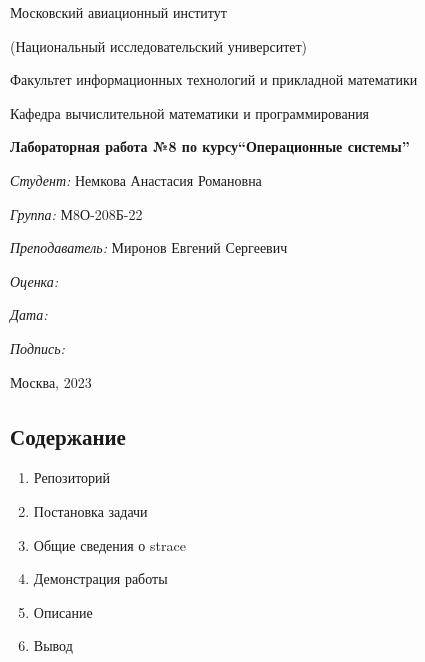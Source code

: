 \documentclass[a4paper, 14pt]{article}
\begin{document}
\thispagestyle{empty}	
\begin{center}
	Московский авиационный институт
	
	(Национальный исследовательский университет)
	
	Факультет информационных технологий и прикладной математики
	
	Кафедра вычислительной математики и программирования
	
\end{center}
\vspace{40ex}
\begin{center}
	\textbf{\large{Лабораторная работа №8 по курсу\linebreak \textquotedblleft Операционные системы\textquotedblright}}
\end{center}
\vspace{35ex}
\begin{flushright}
	\textit{Студент: } Немкова Анастасия Романовна
	
	\vspace{2ex}
	\textit{Группа: } М8О-208Б-22
	
	\vspace{2ex}
	\textit{Преподаватель: } Миронов Евгений Сергеевич
	
	\vspace{2ex}
	\textit{Оценка: } \underline{\quad\quad\quad\quad\quad\quad}
	
	 \vspace{2ex}
	\textit{Дата: } \underline{\quad\quad\quad\quad\quad\quad}
	
	\vspace{2ex}
	\textit{Подпись: } \underline{\quad\quad\quad\quad\quad\quad}
	
\end{flushright}

\vspace{5ex}

\begin{vfill}
	\begin{center}
		Москва, 2023
	\end{center}	
\end{vfill}
\newpage

\begin{center}
\section*{Содержание}   
\end{center}
\vspace{5ex}
\begin{enumerate}
  \item Репозиторий
  \item Постановка задачи
  \item Общие сведения о strace
  \item Демонстрация работы
  \item Описание
  \item Вывод
\end{enumerate}
\newpage
\end{document}
